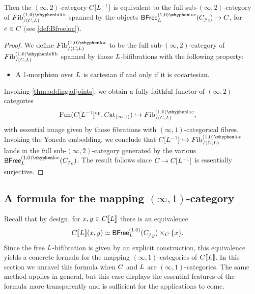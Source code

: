 \documentclass[a4paper,reqno,twoside]{amsart}
\begin{document}
\begin{corollary}\label{cor:dwyerkan}
	 Then the $(\infty,2)$-category $\relax{C}[\relax{L}^{-1}]$ is equivalent to the full sub-$(\infty,2)$-category of $\Fib^{(1,0)\mhyphen\bifib}_{/(\cC,\cL)}$ spanned by the objects $\BFree^{(1,0)\mhyphen\loc}_{\cL}(\cC_{\upslash c}) \to \cC$, for $c\in \relax{C}$ (see \cref{def:Bfreeloc}).
\end{corollary}
\begin{proof}
	We define $\Fib^{(1,0)\mhyphen\mathrm{loc}}_{/(\cC,\cL)}$ to be the full sub-$(\infty,2)$-category of $\Fib^{(1,0)\mhyphen\bifib}_{/(\cC,\cL)}$ spanned by those $\relax{L}$-bifibrations with the following property:
	\begin{itemize}
		\item A 1-morphism over $\relax{L}$ is cartesian if and only if it is cocartesian.
	\end{itemize}
	Invoking \cref{thm:addingadjoints}, we obtain a fully faithful functor of $(\infty,2)$-categories 
	\[
		\Fun(\cC[\cL^{-1}]^{\op},\Cat_{(\infty,1)})\hookrightarrow\Fib^{(1,0)\mhyphen\mathrm{loc}}_{/(\cC,\cL)} ,
	\]
	 with essential image given by those fibrations with $(\infty,1)$-categorical fibres. Invoking the Yoneda embedding, we conclude that $\cC[\cL^{-1}] \hookrightarrow{} \Fib^{(1,0)\mhyphen\mathrm{loc}}_{/(\cC,\cL)}$ lands in the full sub-$(\infty,2)$-category generated by the various $\BFree^{(1,0)\mhyphen\loc}_{\cL}(\cC_{\upslash c})$. The result follows since $\relax{C} \to \relax{C}[\relax{L}^{-1}]$ is essentially surjective.
\end{proof}





\subsection{A formula for the mapping $(\infty,1)$-category}\label{subsec:mappingformula}
Recall that by design, for $x,y \in \relax{C}[\![\relax{L}]\!]$ there is an equivalence
\[
	\cC\soft{\cL}(x,y) \simeq \BFree^{(1,0)}_{\cL}(\cC_{\upslash y})\times_{\cC}\{x\}.
\]
Since the free $\relax{L}$-bifibration is given by an explicit construction, this equivalence yields a concrete formula for the mapping $(\infty,1)$-categories of $\relax{C}[\![\relax{L}]\!]$. In  this section we unravel this formula when $\relax{C}$ and $\relax{L}$ are $(\infty,1)$-categories. The same method applies in general, but this case displays the essential features of the formula more transparently and is sufficient for the applications to come.
\end{document}
